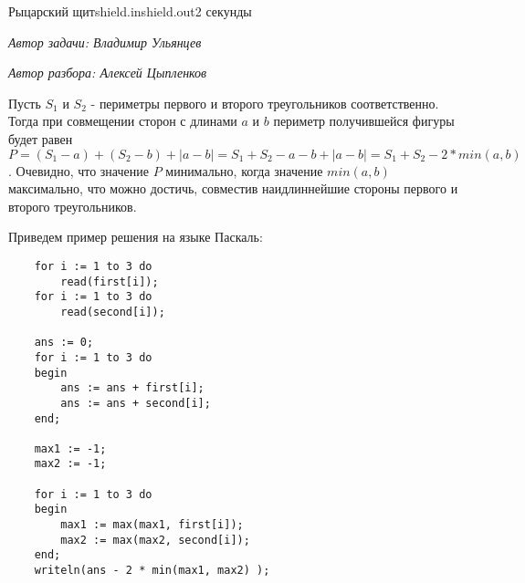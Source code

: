 \begin{problem}{Рыцарский щит}{shield.in}{shield.out}{2 секунды}


\renewcommand{\min}{min}

\begin{flushright}
\emph{Автор задачи: Владимир Ульянцев}

\emph{Автор разбора: Алексей Цыпленков}
\end{flushright}

Пусть $S_1$ и $S_2$ - периметры первого и второго треугольников соответственно.
Тогда при совмещении сторон с длинами $a$ и $b$ периметр получившейся фигуры 
будет равен $P = (S_1 - a) + (S_2 - b) + |a - b| = S_1 + S_2 - a - b + |a - b| =
S_1 + S_2 - 2 * min(a, b)$.
Очевидно, что значение $P$ минимально, когда значение $min(a, b)$ максимально,
что можно достичь, совместив наидлиннейшие стороны первого и второго треугольников.

Приведем пример решения на языке Паскаль:

\begin{lstlisting}
    for i := 1 to 3 do
        read(first[i]);
    for i := 1 to 3 do
        read(second[i]);

    ans := 0;
    for i := 1 to 3 do
    begin
        ans := ans + first[i];
        ans := ans + second[i];
    end;

    max1 := -1;
    max2 := -1;

    for i := 1 to 3 do
    begin
        max1 := max(max1, first[i]);
        max2 := max(max2, second[i]);
    end;
    writeln(ans - 2 * min(max1, max2) );
\end{lstlisting}
\end{problem}

